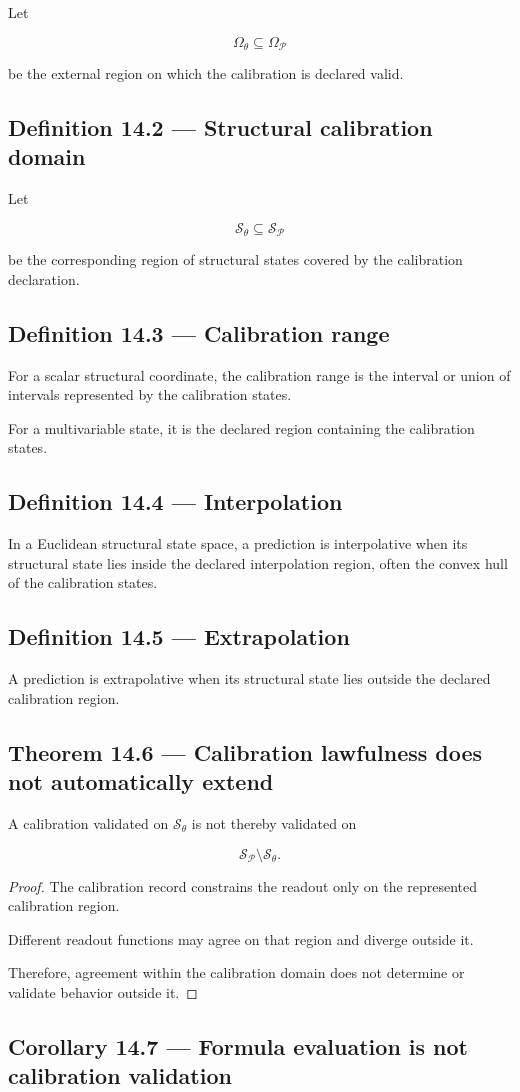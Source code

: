 \documentclass[11pt,oneside,openany]{book}
\newcommand{\PCsubsection}[1]{%
  \subsection*{#1}%
}
\begin{document}
Let

\[
\boxed{ \Omega_\theta \subseteq \Omega_{\mathcal P} }
\]

be the external region on which the calibration is declared valid.

\PCsubsection{Definition 14.2 --- Structural calibration domain}

Let

\[
\boxed{ \mathcal S_\theta \subseteq \mathcal S_{\mathcal P} }
\]

be the corresponding region of structural states covered by the calibration declaration.

\PCsubsection{Definition 14.3 --- Calibration range}

For a scalar structural coordinate, the calibration range is the interval or union of intervals represented by the calibration states.

For a multivariable state, it is the declared region containing the calibration states.

\PCsubsection{Definition 14.4 --- Interpolation}

In a Euclidean structural state space, a prediction is interpolative when its structural state lies inside the declared interpolation region, often the convex hull of the calibration states.

\PCsubsection{Definition 14.5 --- Extrapolation}

A prediction is extrapolative when its structural state lies outside the declared calibration region.

\PCsubsection{Theorem 14.6 --- Calibration lawfulness does not automatically extend}

A calibration validated on \(\mathcal S_\theta\) is not thereby validated on

\[
\mathcal S_{\mathcal P}\setminus\mathcal S_\theta.
\]

\begin{proof}
The calibration record constrains the readout only on the represented calibration region.

Different readout functions may agree on that region and diverge outside it.

Therefore, agreement within the calibration domain does not determine or validate behavior outside it.

\end{proof}

\PCsubsection{Corollary 14.7 --- Formula evaluation is not calibration validation}
\end{document}
